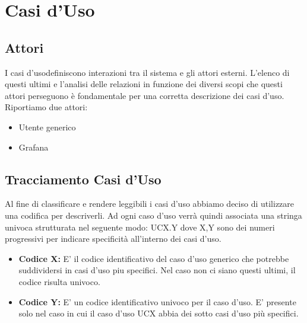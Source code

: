 \section{Casi d'Uso}
		\subsection{Attori}			
        I casi d'uso\pedice definiscono interazioni tra il sistema e gli attori esterni\pedice. L'elenco di questi ultimi e l'analisi delle relazioni in funzione dei diversi scopi che questi attori perseguono è fondamentale per una corretta descrizione dei casi d'uso.
        Riportiamo due attori:
        \begin{itemize}
            \item Utente generico
            \item Grafana
        \end{itemize}


		\subsection{Tracciamento Casi d'Uso}
        Al fine di classificare e rendere leggibili i casi d'uso abbiamo deciso di utilizzare una codifica per descriverli. Ad ogni caso d'uso verrà quindi associata una stringa univoca strutturata nel seguente modo: UCX.Y  dove X,Y sono dei numeri progressivi per indicare specificità all'interno dei casi d'uso.
        \begin{itemize}
        \item \textbf{Codice X:} E' il codice identificativo del caso d'uso generico che potrebbe suddividersi in casi d'uso piu specifici. Nel caso non ci siano questi ultimi, il codice risulta univoco. 
        \item \textbf{Codice Y:} E' un codice identificativo univoco per il caso d'uso. E' presente solo nel caso in cui il caso d'uso UCX abbia dei sotto casi d'uso più specifici.
        \end{itemize}
        

